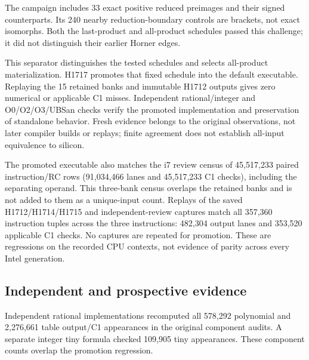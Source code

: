 \documentclass[11pt]{article}
\begin{document}
The campaign includes 33 exact positive reduced preimages and their signed
counterparts. Its 240 nearby reduction-boundary controls are brackets, not
exact isomorphs. Both the last-product and all-product schedules passed this
challenge; it did not distinguish their earlier Horner edges.

This separator distinguishes the tested schedules and selects all-product
materialization. H1717
promotes that fixed schedule into the default executable. Replaying the
15 retained banks and immutable H1712 outputs gives zero numerical or
applicable C1 misses. Independent rational/integer and O0/O2/O3/UBSan checks
verify the promoted implementation and preservation of standalone behavior.
Fresh evidence belongs to the original observations, not later compiler
builds or replays; finite agreement does not establish all-input equivalence
to silicon.

The promoted executable also matches the i7 review census of
45{,}517{,}233 paired instruction/RC rows (91{,}034{,}466 lanes and
45{,}517{,}233 C1 checks), including the separating operand. This three-bank
census overlaps the retained banks and is not added to them as a unique-input
count. Replays of the saved H1712/H1714/H1715 and independent-review captures
match all 357{,}360 instruction tuples across the three instructions:
482{,}304 output lanes and 353{,}520 applicable C1 checks. No captures are
repeated for promotion. These are regressions on the recorded CPU contexts,
not evidence of parity across every Intel generation.

\subsection{Independent and prospective evidence}

Independent rational implementations recomputed all 578{,}292 polynomial
and 2{,}276{,}661 table output/C1 appearances in the original component
audits. A separate integer tiny formula checked 109{,}905 tiny appearances.
These component counts overlap the promotion regression.
\end{document}
